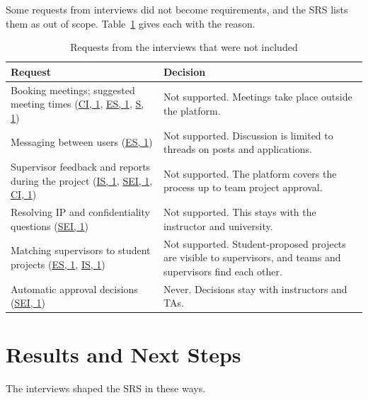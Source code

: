 \documentclass{article}
\newcommand{\intlink}[3]{\hyperref[int:#1-#2]{#3}}
\newcommand{\intref}[2]{\intlink{#1}{#2}{#1, #2}}
\begin{document}
    Some requests from interviews did not become requirements, and the SRS lists them as out of scope.
    Table~\ref{tab:excluded} gives each with the reason.

    \begin{table}[h!]
        \centering
        \renewcommand{\arraystretch}{1.2}
        \begin{tabularx}{\textwidth}{>{\raggedright\arraybackslash}p{} >{\raggedright\arraybackslash}X}
            \toprule
            \textbf{Request} & \textbf{Decision}\\
            \midrule
            Booking meetings; suggested meeting times (\intref{CI}{1}, \intref{ES}{1}, \intref{S}{1}) & Not supported. Meetings take place outside the platform.\\
            Messaging between users (\intref{ES}{1}) & Not supported. Discussion is limited to threads on posts and applications.\\
            Supervisor feedback and reports during the project (\intref{IS}{1}, \intref{SEI}{1}, \intref{CI}{1}) & Not supported. The platform covers the process up to team project approval.\\
            Resolving IP and confidentiality questions (\intref{SEI}{1}) & Not supported. This stays with the instructor and university.\\
            Matching supervisors to student projects (\intref{ES}{1}, \intref{IS}{1}) & Not supported. Student-proposed projects are visible to supervisors, and teams and supervisors find each other.\\
            Automatic approval decisions (\intref{SEI}{1}) & Never. Decisions stay with instructors and TAs.\\
            \bottomrule
        \end{tabularx}
        \caption{Requests from the interviews that were not included}
        \label{tab:excluded}
    \end{table}

    \section{Results and Next Steps}
    \label{sec:results}

    The interviews shaped the SRS in these ways.
\end{document}

